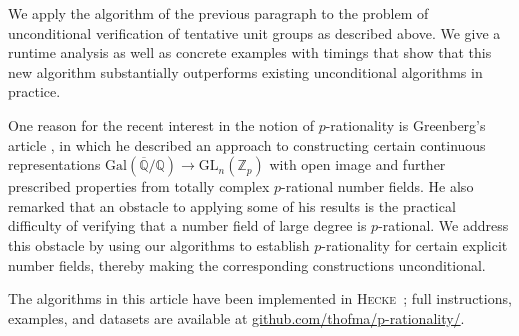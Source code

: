 \documentclass[12pt, a4paper, usenames]{amsart}
\newcommand{\Z}{\mathbb{Z}}
\newcommand{\Q}{\mathbb{Q}}
\theoremstyle{plain}
\theoremstyle{remark}
\theoremstyle{definition}
\newcommand{\Gal}{\mathrm{Gal}}
\newcommand{\GL}{\mathrm{GL}}
\begin{document}
We apply the algorithm of the previous paragraph to the problem of unconditional verification of tentative unit groups as described above. 
We give a runtime analysis as well as concrete examples with timings that show that this new algorithm substantially outperforms existing unconditional algorithms in practice. 

One reason for the recent interest in the notion of 
$p$-rationality is Greenberg's article \cite{MR3512524},
in which he described an approach to constructing certain continuous representations 
$\Gal(\overline{\Q}/\Q) \longrightarrow \GL_{n}(\Z_{p})$
with open image and further prescribed properties
from totally complex $p$-rational number fields.
He also remarked that an obstacle to applying some of his results is
the practical difficulty of verifying that a number field of large degree is $p$-rational.
We address this obstacle by using our algorithms to establish $p$-rationality for certain explicit number fields, thereby making the corresponding constructions unconditional.

The algorithms in this article have been implemented in \textsc{Hecke}~\cite{MR3703682}; full instructions, examples, and datasets are 
available at \url{github.com/thofma/p-rationality/}.
\end{document}
